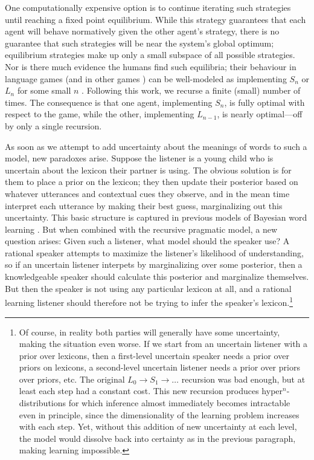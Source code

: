 \documentclass{article} %
\begin{document}
One computationally expensive option is to continue iterating such strategies until reaching a fixed point equilibrium. While this strategy guarantees that each agent will behave normatively given the other agent's strategy, there is no guarantee that such strategies will be near the system's global optimum; equilibrium strategies make up only a small subspace of all possible strategies. Nor is there much evidence the humans find such equilibria; their behaviour in language games (and in other games \cite{camerer2004}) can be well-modeled as implementing $S_n$ or $L_n$ for some small $n$ \cite{frank2012}. Following this work, we  recurse a finite (small) number of times. The consequence is that one agent, implementing $S_n$, is fully optimal with respect to the game, while the other, implementing $L_{n-1}$, is nearly optimal---off by only a single recursion.

As soon as we attempt to add uncertainty about the meanings of words to such a model, new paradoxes arise. Suppose the listener is a young child who is uncertain about the lexicon their partner is using. The obvious solution is for them to place a prior on the lexicon; they then update their posterior based on whatever utterances and contextual cues they observe, and in the mean time interpret each utterance by making their best guess, marginalizing out this uncertainty. This basic structure is captured in previous models of Bayesian word learning \cite{frank2009}. But when combined with the recursive pragmatic model, a new question arises: Given such a listener, what model should the speaker use? A rational speaker attempts to maximize the listener's likelihood of understanding, so if an uncertain listener interpets by marginalizing over some posterior, then a knowledgeable speaker should calculate this posterior and marginalize themselves. But then the speaker is not using any particular lexicon at all, and a rational learning listener should therefore not be trying to infer the speaker's lexicon.\footnote{Of course, in reality both parties will generally have some uncertainty, making the situation even worse. If we start from an uncertain listener with a prior over lexicons, then a first-level uncertain speaker needs a prior over priors on lexicons, a second-level uncertain listener needs a prior over priors over priors, etc. The original $L_0 \rightarrow S_1 \rightarrow \dots$ recursion was bad enough, but at least each step had a constant cost. This new recursion produces hyper$^n$-distributions for which inference almost immediately becomes intractable even in principle, since the dimensionality of the learning problem increases with each step. Yet, without this addition of new uncertainty at each level, the model would dissolve back into certainty as in the previous paragraph, making learning impossible.}%
\end{document}
